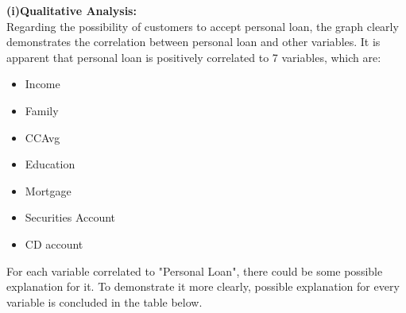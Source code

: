 \documentclass[]{article}
\begin{document}
\textbf{(i)Qualitative Analysis:}\\
Regarding the possibility of customers to accept personal loan, the graph clearly demonstrates the correlation between personal loan and other variables. It is apparent that personal loan is positively correlated to 7 variables, which are:
\begin{itemize}
	\item Income
	\item Family
	\item CCAvg
	\item Education
	\item Mortgage
	\item Securities Account
	\item CD account
\end{itemize}

For each variable correlated to "Personal Loan", there could be some possible explanation for it. To demonstrate it more clearly, possible explanation for every variable is concluded in the table below.\\
\makeatletter\def\@captype{table}\makeatother
\end{document}
